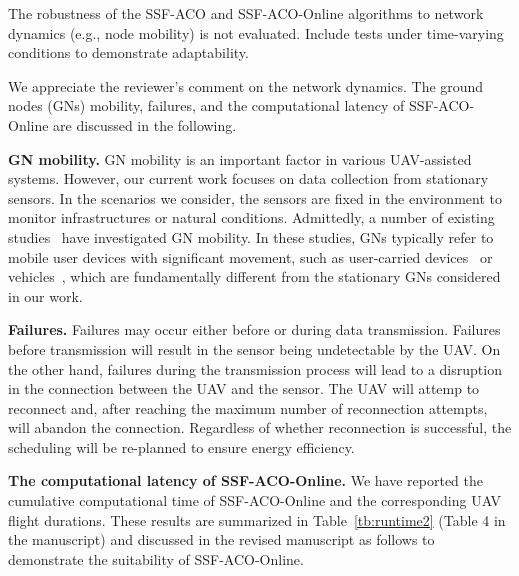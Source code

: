 \begin{revcomment}
	The robustness of the SSF-ACO and SSF-ACO-Online algorithms to network dynamics (e.g., node mobility) is not evaluated. Include tests under time-varying conditions to demonstrate adaptability.
\end{revcomment}
\begin{revresponse}
	We appreciate the reviewer's comment on the network dynamics.
	The ground nodes (GNs) mobility, failures, and the computational latency of SSF-ACO-Online are discussed in the following.

	\textbf{GN mobility.}
	GN mobility is an important factor in various UAV-assisted systems.
	However, our current work focuses on data collection from stationary sensors.
	In the scenarios we consider, the sensors are fixed in the environment to monitor infrastructures or natural conditions.
	Admittedly, a number of existing studies~\cite{GNmob1, GNmob2, GNmob3, GNmob4} have investigated GN mobility.
	In these studies, GNs typically refer to mobile user devices with significant movement, such as user-carried devices~\cite{GNmob1,GNmob2} or vehicles~\cite{GNmob3,GNmob4}, which are fundamentally different from the stationary GNs considered in our work.

	\textbf{Failures.}
	Failures may occur either before or during data transmission.
	Failures before transmission will result in the sensor being undetectable by the UAV.
	On the other hand, failures during the transmission process will lead to a disruption in the connection between the UAV and the sensor.
	The UAV will attemp to reconnect and, after reaching the maximum number of reconnection attempts, will abandon the connection.
	Regardless of whether reconnection is successful, the scheduling will be re-planned to ensure energy efficiency.

	\textbf{The computational latency of SSF-ACO-Online.}
	We have reported the cumulative computational time of SSF-ACO-Online and the corresponding UAV flight durations.
	These results are summarized in Table~\ref{tb:runtime2} (Table 4 in the manuscript) and discussed in the revised manuscript as follows to demonstrate the suitability of SSF-ACO-Online.


\end{revresponse}
